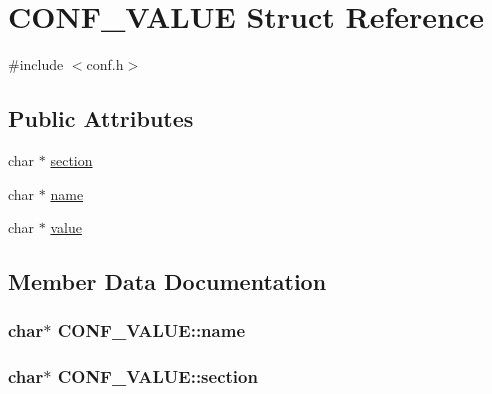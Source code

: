 \hypertarget{struct_c_o_n_f___v_a_l_u_e}{}\section{C\+O\+N\+F\+\_\+\+V\+A\+L\+UE Struct Reference}
\label{struct_c_o_n_f___v_a_l_u_e}


{\ttfamily \#include $<$conf.\+h$>$}

\subsection*{Public Attributes}
\begin{DoxyCompactItemize}
\item 
char $\ast$ \hyperlink{struct_c_o_n_f___v_a_l_u_e_a103e4a73b3523e1a3e4d4fd8f32a7fe0}{section}
\item 
char $\ast$ \hyperlink{struct_c_o_n_f___v_a_l_u_e_a11c4d31c2078948fab12fd3fe2f75bbc}{name}
\item 
char $\ast$ \hyperlink{struct_c_o_n_f___v_a_l_u_e_adc4e5ad327beced987b0d51bc4bdeb6e}{value}
\end{DoxyCompactItemize}


\subsection{Member Data Documentation}
\subsubsection[{\texorpdfstring{name}{name}}]{\setlength{\rightskip}{0pt plus 5cm}char$\ast$ C\+O\+N\+F\+\_\+\+V\+A\+L\+U\+E\+::name}\hypertarget{struct_c_o_n_f___v_a_l_u_e_a11c4d31c2078948fab12fd3fe2f75bbc}{}\label{struct_c_o_n_f___v_a_l_u_e_a11c4d31c2078948fab12fd3fe2f75bbc}
\subsubsection[{\texorpdfstring{section}{section}}]{\setlength{\rightskip}{0pt plus 5cm}char$\ast$ C\+O\+N\+F\+\_\+\+V\+A\+L\+U\+E\+::section}\hypertarget{struct_c_o_n_f___v_a_l_u_e_a103e4a73b3523e1a3e4d4fd8f32a7fe0}{}\label{struct_c_o_n_f___v_a_l_u_e_a103e4a73b3523e1a3e4d4fd8f32a7fe0}
